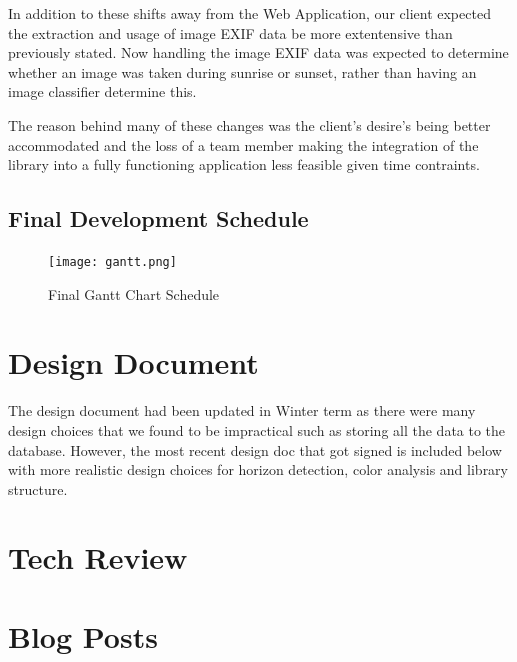 \documentclass[onecolumn, draftclsnofoot,10pt, compsoc]{IEEEtran}
\begin{document}
\begin{singlespace}
		
		In addition to these shifts away from the Web Application, our client expected the extraction and usage of image EXIF data be more extentensive than previously stated.
		Now handling the image EXIF data was expected to determine whether an image was taken during sunrise or sunset, rather than having an image classifier determine this.
		
		
		The reason behind many of these changes was the client's desire's being better accommodated and the loss of a team member making the integration of the library into a fully functioning application less feasible given time contraints.
		\begin{landscape}
			\subsection{Final Development Schedule}
			\begin{figure}[h]
				\texttt{[image: gantt.png]}
				\caption{Final Gantt Chart Schedule}
				\label{fig:Final Schedule}
			\end{figure}
		\end{landscape}
	\section{Design Document}
		The design document had been updated in Winter term as there were many design choices that we found to be impractical such as storing all the data to the database. 
		However, the most recent design doc that got signed is included below with more realistic design choices for horizon detection, color analysis and library structure.
		
	\section{Tech Review}
		
	\section{Blog Posts}

\end{singlespace}
\end{document}
